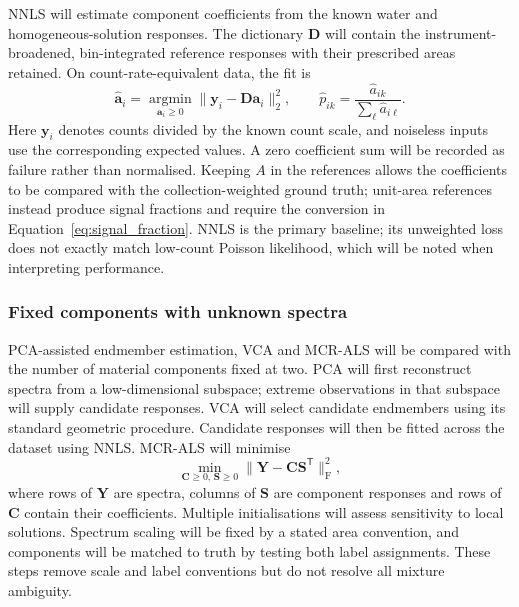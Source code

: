 \documentclass[11pt]{article}
\begin{document}
NNLS will estimate component coefficients from the known water and homogeneous-solution responses. The dictionary $\mathbf D$ will contain the instrument-broadened, bin-integrated reference responses with their prescribed areas retained. On count-rate-equivalent data, the fit is
\begin{equation}
 \widehat{\mathbf a}_i=\underset{\mathbf a_i\geq0}{\operatorname{argmin}}
 \|\mathbf y_i-\mathbf D\mathbf a_i\|_2^2,
 \qquad \widehat p_{ik}=\frac{\widehat a_{ik}}{\sum_\ell\widehat a_{i\ell}}.
 \label{eq:known_fit}
\end{equation}
Here $\mathbf y_i$ denotes counts divided by the known count scale, and noiseless inputs use the corresponding expected values. A zero coefficient sum will be recorded as failure rather than normalised. Keeping $A$ in the references allows the coefficients to be compared with the collection-weighted ground truth; unit-area references instead produce signal fractions and require the conversion in Equation~\ref{eq:signal_fraction}. NNLS is the primary baseline; its unweighted loss does not exactly match low-count Poisson likelihood, which will be noted when interpreting performance.

\subsubsection{Fixed components with unknown spectra}

PCA-assisted endmember estimation, VCA and MCR-ALS will be compared with the number of material components fixed at two. PCA will first reconstruct spectra from a low-dimensional subspace; extreme observations in that subspace will supply candidate responses. VCA will select candidate endmembers using its standard geometric procedure. Candidate responses will then be fitted across the dataset using NNLS. MCR-ALS will minimise
\begin{equation}
 \min_{\mathbf C\geq0,\,\mathbf S\geq0}
 \|\mathbf Y-\mathbf C\mathbf S^{\mathsf T}\|_{\mathrm F}^{2},
 \label{eq:mcr}
\end{equation}
where rows of $\mathbf Y$ are spectra, columns of $\mathbf S$ are component responses and rows of $\mathbf C$ contain their coefficients. Multiple initialisations will assess sensitivity to local solutions. Spectrum scaling will be fixed by a stated area convention, and components will be matched to truth by testing both label assignments. These steps remove scale and label conventions but do not resolve all mixture ambiguity.
\end{document}
